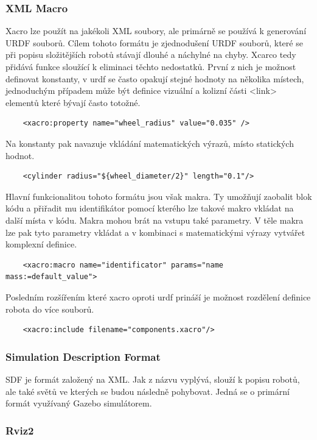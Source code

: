 \subsubsection*{XML Macro}
Xacro lze použít na jakékoli XML soubory, ale primárně se používá k generování URDF souborů. Cílem tohoto formátu je zjednodušení URDF souborů, které se při popisu složitějších robotů stávají dlouhé a náchylné na chyby. Xcarco tedy přidává funkce sloužící k eliminaci těchto nedostatků. 
První z nich je možnost definovat konstanty, v urdf se často opakují stejné hodnoty na několika místech, jednoduchým případem může být definice vizuální a kolizní části <link> elementů které bývají často totožné. 
\begin{verbatim}
	<xacro:property name="wheel_radius" value="0.035" />
\end{verbatim}
Na konstanty pak navazuje vkládání matematických výrazů, místo statických hodnot.
\begin{verbatim}
	<cylinder radius="${wheel_diameter/2}" length="0.1"/>
\end{verbatim}
Hlavní funkcionalitou tohoto formátu jsou však makra. Ty umožňují zaobalit blok kódu a přiřadit mu identifikátor pomocí kterého lze takové makro vkládat na další místa v kódu. 
Makra mohou brát na vstupu také parametry. V těle makra lze pak tyto parametry vkládat a v kombinaci s matematickými výrazy vytvářet komplexní definice.
\begin{verbatim}
	<xacro:macro name="identificator" params="name mass:=default_value">
\end{verbatim}
Posledním rozšířením které xacro oproti urdf prináší je možnost rozdělení definice robota do více souborů.
\begin{verbatim}
	<xacro:include filename="components.xacro"/>
\end{verbatim}

\subsubsection*{Simulation Description Format}

SDF je formát založený na XML. Jak z názvu vyplývá, slouží k popisu robotů, ale také světů ve kterých se budou následně pohybovat. Jedná se o primární formát využívaný Gazebo simulátorem.

\subsubsection*{Rviz2}

